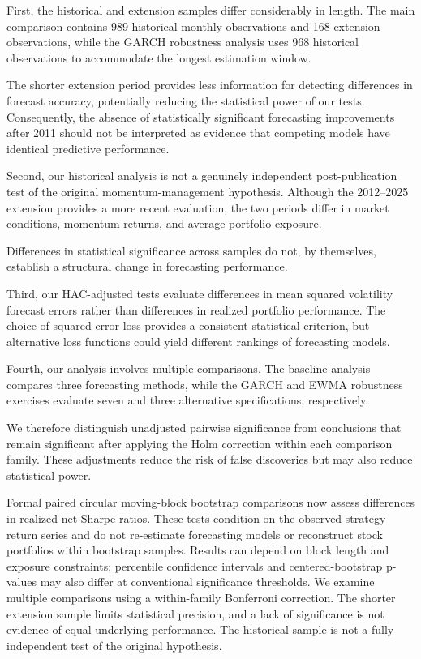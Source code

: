 \documentclass[11pt]{article}
\begin{document}
First, the historical and extension samples
differ considerably in length. The main
comparison contains 989 historical monthly
observations and 168 extension observations,
while the GARCH robustness analysis uses
968 historical observations to accommodate
the longest estimation window.

The shorter extension period provides
less information for detecting differences
in forecast accuracy, potentially reducing
the statistical power of our tests.
Consequently, the absence of statistically
significant forecasting improvements
after 2011 should not be interpreted
as evidence that competing models have
identical predictive performance.

Second, our historical analysis is not
a genuinely independent post-publication
test of the original momentum-management
hypothesis. Although the 2012--2025
extension provides a more recent
evaluation, the two periods differ
in market conditions, momentum returns,
and average portfolio exposure.

Differences in statistical significance
across samples do not, by themselves,
establish a structural change in
forecasting performance.

Third, our HAC-adjusted tests evaluate
differences in mean squared volatility
forecast errors rather than differences
in realized portfolio performance.
The choice of squared-error loss
provides a consistent statistical
criterion, but alternative loss
functions could yield different
rankings of forecasting models.

Fourth, our analysis involves multiple
comparisons. The baseline analysis
compares three forecasting methods,
while the GARCH and EWMA robustness
exercises evaluate seven and three
alternative specifications, respectively.

We therefore distinguish unadjusted
pairwise significance from conclusions
that remain significant after applying
the Holm correction within each
comparison family. These adjustments
reduce the risk of false discoveries
but may also reduce statistical power.

Formal paired circular moving-block bootstrap comparisons now assess differences in realized net Sharpe ratios. These tests condition on the observed strategy return series and do not re-estimate forecasting models or reconstruct stock portfolios within bootstrap samples. Results can depend on block length and exposure constraints; percentile confidence intervals and centered-bootstrap p-values may also differ at conventional significance thresholds. We examine multiple comparisons using a within-family Bonferroni correction. The shorter extension sample limits statistical precision, and a lack of significance is not evidence of equal underlying performance. The historical sample is not a fully independent test of the original hypothesis.
\end{document}
